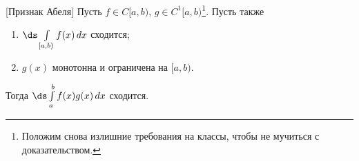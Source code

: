 [Признак Абеля]
	Пусть $f\in C[a,b)$, $g\in C^1[a,b)$\footnote{Положим снова излишние требования на классы, чтобы не мучиться с доказательством.}.
	Пусть также
	\begin{enumerate}
	  \item $\ds\int\limits_{[a,b)}f(x)\,dx$ сходится;
	  \item $g(x)$ монотонна и ограничена на $[a,b)$.
	\end{enumerate}
	Тогда $\ds\int\limits_a^bf(x)g(x)\,dx$ сходится.
	